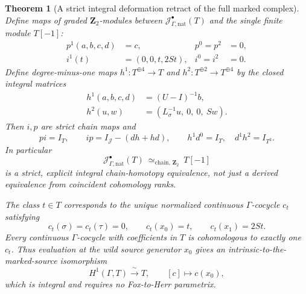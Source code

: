 \documentclass[11pt]{article}
\newtheorem{theorem}{Theorem}[section]
\theoremstyle{definition}
\begin{document}
\begin{theorem}[A strict integral deformation retract of the full marked complex]
\label{thm:dyadic-s3-natural-strict-retract}
Define maps of graded
$\mathbf Z_2$-modules between
$\mathcal J^\bullet_{\Gamma,\mathrm{nat}}(T)$
and the single finite module
$T[-1]$:
\begin{equation}\label{eq:dyadic-s3-natural-pi-maps}
\begin{aligned}
p^1(a,b,c,d)&=c,
 &p^0=p^2&=0,\\
i^1(t)&=(0,0,t,2St),
 &i^0=i^2&=0.
\end{aligned}
\end{equation}
Define degree-minus-one
maps $h^1:T^{\oplus4}\to T$ and
$h^2:T^{\oplus2}\to T^{\oplus4}$
by the \emph{closed integral}
matrices
\begin{equation}\label{eq:dyadic-s3-natural-explicit-homotopy}
\boxed{
\begin{aligned}
h^1(a,b,c,d)&=(U-I)^{-1}b,
\\
h^2(u,w)&=(L_\sigma^{-1}u,\ 0,\ 0,\ Sw).
\end{aligned}}
\end{equation}
Then $i,p$ are strict chain
maps and
\begin{equation}\label{eq:dyadic-s3-natural-contraction-identities}
\boxed{\qquad
p i=I_T,\qquad
i p=I_{\mathcal J}-(d h+h d),
\qquad
h^1d^0=I_T,\quad d^1h^2=I_{T^2}.
\qquad}
\end{equation}
In particular
\begin{equation}\label{eq:dyadic-s3-natural-complex-retract}
\mathcal J^\bullet_{\Gamma,\mathrm{nat}}(T)
\ \simeq_{\mathrm{chain},\,\mathbf Z_2}\
T[-1]
\end{equation}
is a \emph{strict, explicit
integral chain-homotopy equivalence},
not just a derived equivalence
from coincident cohomology ranks.

The class $t\in T$ corresponds
to the unique normalized continuous
$\Gamma$-cocycle $c_t$ satisfying
\begin{equation}\label{eq:dyadic-s3-natural-normalized-cocycle}
\boxed{
c_t(\sigma)=c_t(\tau)=0,\qquad
c_t(x_0)=t,\qquad
c_t(x_1)=2St.
}
\end{equation}
Every continuous $\Gamma$-cocycle
with coefficients in $T$ is
cohomologous to exactly one
$c_t$.  Thus evaluation at the
wild source generator $x_0$
gives an intrinsic-to-the-marked-source
isomorphism
\begin{equation}\label{eq:dyadic-s3-natural-cohom-coordinate}
H^1(\Gamma,T)\xrightarrow{\;\sim\;}T,
\qquad[c]\longmapsto c(x_0),
\end{equation}
which is integral and requires
no Fox-to-Herr parametrix.
\end{theorem}
\end{document}

